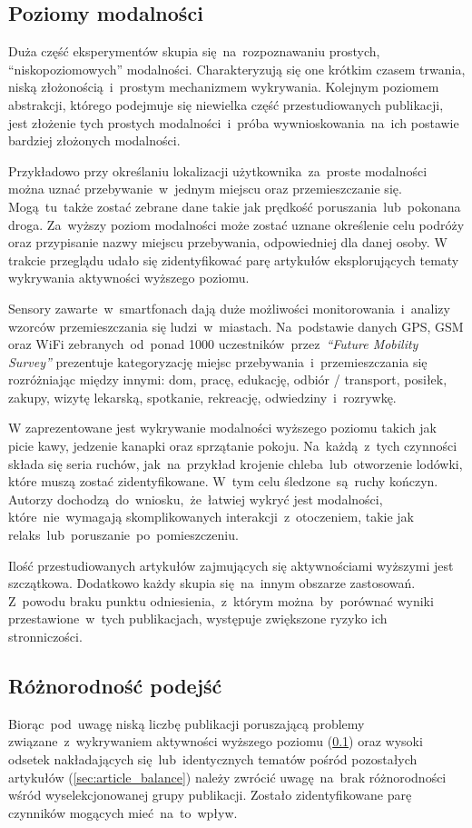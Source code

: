 \subsection{Poziomy modalności}
\label{sec:modality_levels}
Duża część eksperymentów skupia się~na~rozpoznawaniu prostych, ``niskopoziomowych'' modalności. Charakteryzują się one krótkim czasem trwania, niską złożonością~i~prostym mechanizmem wykrywania. Kolejnym poziomem abstrakcji, którego podejmuje się niewielka część przestudiowanych publikacji, jest złożenie tych prostych modalności~i~próba wywnioskowania~na~ich postawie bardziej złożonych modalności.

Przykładowo przy określaniu lokalizacji użytkownika~za~proste modalności można uznać przebywanie~w~jednym miejscu oraz przemieszczanie się. Mogą~tu~także zostać zebrane dane takie jak prędkość poruszania~lub~pokonana droga. Za~wyższy poziom modalności może zostać uznane określenie celu podróży oraz przypisanie nazwy miejscu przebywania, odpowiedniej dla danej osoby. W trakcie przeglądu udało się zidentyfikować parę artykułów eksplorujących tematy wykrywania aktywności wyższego poziomu.
\pagebreak

Sensory zawarte~w~smartfonach dają duże możliwości monitorowania~i~analizy wzorców przemieszczania się ludzi~w~miastach. Na~podstawie danych GPS, GSM oraz WiFi zebranych~od~ponad 1000 uczestników~przez~\textit{``Future Mobility Survey''} \cite{S26} prezentuje kategoryzację miejsc przebywania~i~przemieszczania się rozróżniając między innymi: dom, pracę, edukację, odbiór / transport, posiłek, zakupy, wizytę lekarską, spotkanie, rekreację, odwiedziny~i~rozrywkę.

W \cite{S38} zaprezentowane jest wykrywanie modalności wyższego poziomu takich jak picie kawy, jedzenie kanapki oraz sprzątanie pokoju. Na~każdą~z~tych czynności składa się seria ruchów, jak~na~przykład krojenie chleba~lub~otworzenie lodówki, które muszą zostać zidentyfikowane. W~tym celu śledzone~są~ruchy kończyn. Autorzy dochodzą~do~wniosku,~że~łatwiej wykryć jest modalności, które~nie~wymagają skomplikowanych interakcji~z~otoczeniem, takie jak relaks~lub~poruszanie~po~pomieszczeniu.

Ilość przestudiowanych artykułów zajmujących się aktywnościami wyższymi jest szczątkowa. Dodatkowo każdy skupia się~na~innym obszarze zastosowań. Z~powodu braku punktu odniesienia,~z~którym można~by~porównać wyniki przestawione~w~tych publikacjach, występuje zwiększone ryzyko ich stronniczości. 

\subsection{Różnorodność podejść}
Biorąc~pod~uwagę niską liczbę publikacji poruszającą problemy związane~z~wykrywaniem aktywności wyższego poziomu (\ref{sec:modality_levels}) oraz wysoki odsetek nakładających się~lub~identycznych tematów pośród pozostałych artykułów (\ref{sec:article_balance}) należy zwrócić uwagę~na~brak różnorodności wśród wyselekcjonowanej grupy publikacji. Zostało zidentyfikowane parę czynników mogących mieć~na~to~wpływ. 

